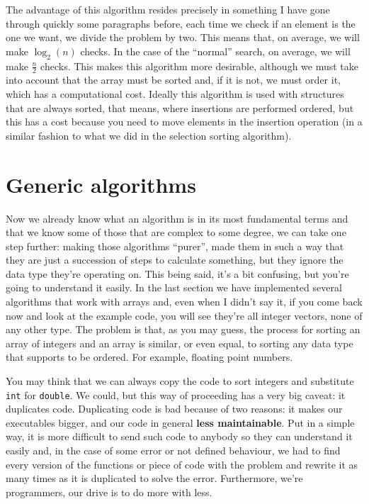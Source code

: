 \documentclass[a4paper]{article}
\begin{document}
The advantage of this algorithm resides precisely in something I have gone
through quickly some paragraphs before, each time we check if an element is the
one we want, we divide the problem by two. This means that, on average, we will
make $\log_{2}{\left(n\right)}$ checks. In the case of the ``normal'' search,
on average, we will make $\frac{n}{2}$ checks. This makes this algorithm more
desirable, although we must take into account that the array must be sorted and,
if it is not, we must order it, which has a computational cost. Ideally this
algorithm is used with structures that are always sorted, that means, where
insertions are performed ordered, but this has a cost because you need to move
elements in the insertion operation (in a similar fashion to what we did in
the selection sorting algorithm).

\section{Generic algorithms}
Now we already know what an algorithm is in its most fundamental terms and that
we know some of those that are complex to some degree, we can take one step
further: making those algorithms ``purer'', made them in such a way that they
are just a succession of steps to calculate something, but they ignore the
data type they're operating on. This being said, it's a bit confusing,
but you're going to understand it easily. In the last section we
have implemented several algorithms that work with arrays and, even when
I didn't say it, if you come back now and look at the example code, you
will see they're all integer vectors, none of any
other type. The problem is that, as you may guess, the process for sorting an
array of integers and an array is similar, or even equal, to sorting
any data type that supports to be ordered. For example, floating point numbers.

You may think that we can always copy the code to sort integers and substitute
\verb!int! for \verb!double!. We could, but this way of proceeding has a very
big caveat: it duplicates code. Duplicating code is bad because of two reasons:
it makes our executables bigger, and our code in general \textbf{less
maintainable}. Put in a simple way, it is more difficult to send such code to
anybody so they can understand it easily and, in the case of some error or not
defined behaviour, we had to find every version of the functions or piece of
code with the problem and rewrite it as many times as it is duplicated to solve
the error. Furthermore, we're programmers, our drive is to do more with less.
\end{document}
